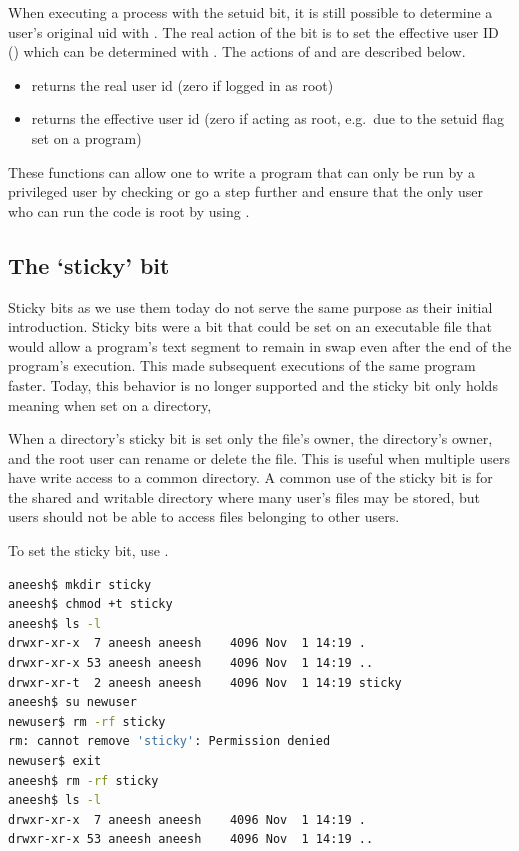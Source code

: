 When executing a process with the setuid bit, it is still possible to determine a user's original uid with .
The real action of the  bit is to set the effective user ID () which can be determined with .
The actions of  and  are described below.

\begin{itemize}
\tightlist
\item
   returns the real user id (zero if logged in as root)
\item
   returns the effective user id (zero if acting as root, e.g.~due to the setuid flag set on a program)
\end{itemize}

These functions can allow one to write a program that can only be run by a privileged user by checking  or go a step further and ensure that the only user who can run the code is root by using .

\subsection{The `sticky' bit}

Sticky bits as we use them today do not serve the same purpose as their initial introduction.
Sticky bits were a bit that could be set on an executable file that would allow a program's text segment to remain in swap even after the end of the program's execution.
This made subsequent executions of the same program faster.
Today, this behavior is no longer supported and the sticky bit only holds meaning when set on a directory,

When a directory's sticky bit is set only the file's owner, the directory's owner, and the root user can rename or delete the file.
This is useful when multiple users have write access to a common directory.
A common use of the sticky bit is for the shared and writable  directory where many user's files may be stored, but users should not be able to access files belonging to other users.

To set the sticky bit, use .

\begin{lstlisting}[language=bash]
aneesh$ mkdir sticky
aneesh$ chmod +t sticky
aneesh$ ls -l
drwxr-xr-x  7 aneesh aneesh    4096 Nov  1 14:19 .
drwxr-xr-x 53 aneesh aneesh    4096 Nov  1 14:19 ..
drwxr-xr-t  2 aneesh aneesh    4096 Nov  1 14:19 sticky
aneesh$ su newuser
newuser$ rm -rf sticky
rm: cannot remove 'sticky': Permission denied
newuser$ exit
aneesh$ rm -rf sticky
aneesh$ ls -l
drwxr-xr-x  7 aneesh aneesh    4096 Nov  1 14:19 .
drwxr-xr-x 53 aneesh aneesh    4096 Nov  1 14:19 ..
\end{lstlisting}


